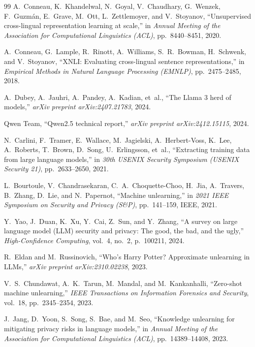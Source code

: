 \documentclass[11pt,a4paper]{article}
\begin{document}
\begin{thebibliography}{99}
A.~Conneau, K.~Khandelwal, N.~Goyal, V.~Chaudhary, G.~Wenzek, F.~Guzm{\'a}n, E.~Grave, M.~Ott, L.~Zettlemoyer, and V.~Stoyanov,
``Unsupervised cross-lingual representation learning at scale,''
in \emph{Annual Meeting of the Association for Computational Linguistics (ACL)}, pp.~8440--8451, 2020.

A.~Conneau, G.~Lample, R.~Rinott, A.~Williams, S.~R.~Bowman, H.~Schwenk, and V.~Stoyanov,
``XNLI: Evaluating cross-lingual sentence representations,''
in \emph{Empirical Methods in Natural Language Processing (EMNLP)}, pp.~2475--2485, 2018.

A.~Dubey, A.~Jauhri, A.~Pandey, A.~Kadian, et~al.,
``The Llama 3 herd of models,''
\emph{arXiv preprint arXiv:2407.21783}, 2024.

Qwen Team,
``Qwen2.5 technical report,''
\emph{arXiv preprint arXiv:2412.15115}, 2024.

N.~Carlini, F.~Tramer, E.~Wallace, M.~Jagielski, A.~Herbert-Voss, K.~Lee, A.~Roberts, T.~Brown, D.~Song, U.~Erlingsson, et~al.,
``Extracting training data from large language models,''
in \emph{30th USENIX Security Symposium (USENIX Security 21)}, pp.~2633--2650, 2021.

L.~Bourtoule, V.~Chandrasekaran, C.~A.~Choquette-Choo, H.~Jia, A.~Travers, B.~Zhang, D.~Lie, and N.~Papernot,
``Machine unlearning,''
in \emph{2021 IEEE Symposium on Security and Privacy (S\&P)}, pp.~141--159, IEEE, 2021.

Y.~Yao, J.~Duan, K.~Xu, Y.~Cai, Z.~Sun, and Y.~Zhang,
``A survey on large language model (LLM) security and privacy: The good, the bad, and the ugly,''
\emph{High-Confidence Computing}, vol.~4, no.~2, p.~100211, 2024.

R.~Eldan and M.~Russinovich,
``Who's Harry Potter? Approximate unlearning in LLMs,''
\emph{arXiv preprint arXiv:2310.02238}, 2023.

V.~S.~Chundawat, A.~K.~Tarun, M.~Mandal, and M.~Kankanhalli,
``Zero-shot machine unlearning,''
\emph{IEEE Transactions on Information Forensics and Security}, vol.~18, pp.~2345--2354, 2023.

J.~Jang, D.~Yoon, S.~Song, S.~Bae, and M.~Seo,
``Knowledge unlearning for mitigating privacy risks in language models,''
in \emph{Annual Meeting of the Association for Computational Linguistics (ACL)}, pp.~14389--14408, 2023.


\end{thebibliography}
\end{document}
